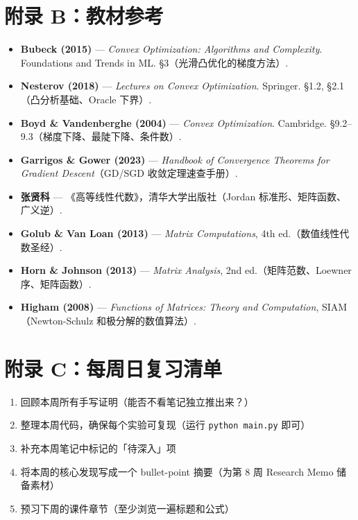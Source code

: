 \documentclass[11pt,a4paper]{ctexart}
\begin{document}
\section*{附录 B：教材参考}

\begin{itemize}
  \item \textbf{Bubeck (2015)} — \textit{Convex Optimization: Algorithms and Complexity}. Foundations and Trends in ML. \S 3（光滑凸优化的梯度方法）.
  \item \textbf{Nesterov (2018)} — \textit{Lectures on Convex Optimization}. Springer. \S 1.2, \S 2.1（凸分析基础、Oracle 下界）.
  \item \textbf{Boyd \& Vandenberghe (2004)} — \textit{Convex Optimization}. Cambridge. \S 9.2--9.3（梯度下降、最陡下降、条件数）.
  \item \textbf{Garrigos \& Gower (2023)} — \textit{Handbook of Convergence Theorems for Gradient Descent}（GD/SGD 收敛定理速查手册）.
  \item \textbf{张贤科} — 《高等线性代数》，清华大学出版社（Jordan 标准形、矩阵函数、广义逆）.
  \item \textbf{Golub \& Van Loan (2013)} — \textit{Matrix Computations}, 4th ed.（数值线性代数圣经）.
  \item \textbf{Horn \& Johnson (2013)} — \textit{Matrix Analysis}, 2nd ed.（矩阵范数、Loewner 序、矩阵函数）.
  \item \textbf{Higham (2008)} — \textit{Functions of Matrices: Theory and Computation}, SIAM（Newton-Schulz 和极分解的数值算法）.
\end{itemize}

\section*{附录 C：每周日复习清单}

\begin{enumerate}[leftmargin=*]
  \item 回顾本周所有手写证明（能否不看笔记独立推出来？）
  \item 整理本周代码，确保每个实验可复现（运行 \texttt{python main.py} 即可）
  \item 补充本周笔记中标记的「待深入」项
  \item 将本周的核心发现写成一个 bullet-point 摘要（为第 8 周 Research Memo 储备素材）
  \item 预习下周的课件章节（至少浏览一遍标题和公式）
\end{enumerate}
\end{document}

